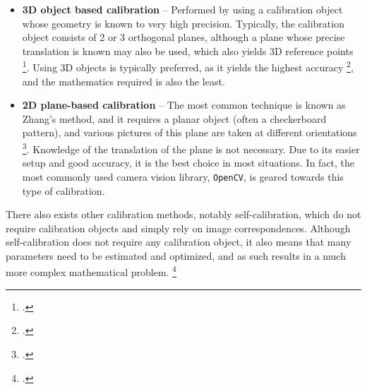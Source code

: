 \begin{itemize}[leftmargin=!, itemindent=-4ex]
    \item \textbf{3D object based calibration} -- Performed by using a calibration object whose geometry is known to very high precision. Typically, the calibration object consists of 2 or 3 orthogonal planes, although a plane whose precise translation is known may also be used, which also yields 3D reference points \footcite{zhangCameraCalibration2007}. Using 3D objects is typically preferred, as it yields the highest accuracy \footcite{zhangCameraCalibration2007}, and the mathematics required is also the least. 
    \item \textbf{2D plane-based calibration} -- The most common technique is known as Zhang's method, and it requires a planar object (often a checkerboard pattern), and various pictures of this plane are taken at different orientations \footcite{zhangFlexibleNew2000}. Knowledge of the translation of the plane is not necessary. Due to its easier setup and good accuracy, it is the best choice in most situations. In fact, the most commonly used camera vision library, \texttt{OpenCV}, is geared towards this type of calibration. 
\end{itemize}

There also exists other calibration methods, notably self-calibration, which do not require calibration objects and simply rely on image correspondences. Although self-calibration does not require any calibration object, it also means that many parameters need to be estimated and optimized, and as such results in a much more complex mathematical problem. \footcite{zhangCameraCalibration2007}
